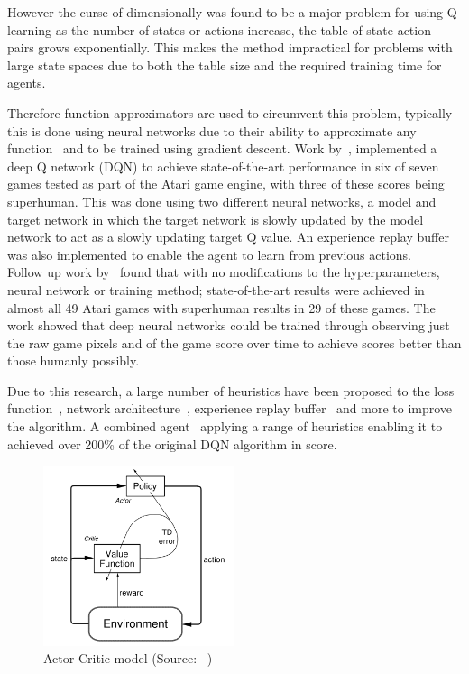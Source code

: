 However the curse of dimensionally was found to be a major problem for using Q-learning as the number of states
or actions increase, the table of state-action pairs grows exponentially. This makes the method
impractical for problems with large state spaces due to both the table size and the required training time for agents.

Therefore function approximators are used to circumvent this problem, typically this is done using neural networks due
to their ability to approximate any function~\citep{csaji2001approximation} and to be trained using gradient descent.
Work by~\cite{atari}, implemented a deep Q network (DQN) to achieve state-of-the-art performance in six
of seven games tested as part of the Atari game engine, with three of these scores being superhuman. This was done
using two different neural networks, a model and target network in which the target network is slowly
updated by the model network to act as a slowly updating target Q value. An experience replay buffer was also
implemented to enable the agent to learn from previous actions. \\
Follow up work by~\cite{mnih2015humanlevel} found that with no modifications to the hyperparameters, neural network or
training method; state-of-the-art results were achieved in almost all 49 Atari games with superhuman results in 29 of
these games. The work showed that deep neural networks could be trained through observing just the raw game pixels and
of the game score over time to achieve scores better than those humanly possibly.

Due to this research, a large number of heuristics have been proposed to the loss function~\citep{doubledqn},
network architecture~\citep{duelingdqn}, experience replay buffer~\citep{prioritizedexperiencereplay} and more to
improve the algorithm. A combined agent~\citep{rainbow} applying a range of heuristics enabling it to
achieved over 200\% of the original DQN algorithm in score.

\begin{figure}
    \includegraphics[width=0.5\textwidth]{figures/2_background_lit_figs/actor-critic.png}
    \caption{Actor Critic model (Source: ~\cite{Sutton1998})}
    \label{fig:actor-critic-model}
\end{figure}

